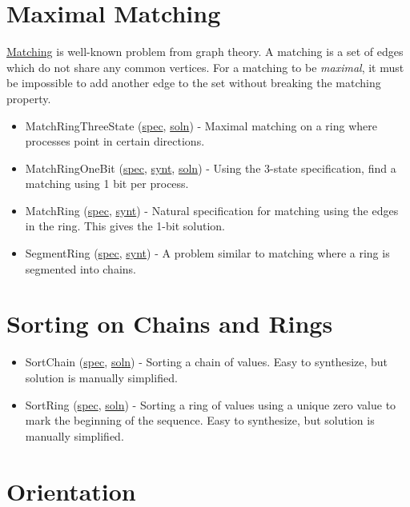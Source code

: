 \section{Maximal Matching}

\href{http://en.wikipedia.org/wiki/Matching_(graph_theory)}{Matching} is well-known problem from graph theory.
A matching is a set of edges which do not share any common vertices.
For a matching to be \textit{maximal}, it must be impossible to add another edge to the set without breaking the matching property.
\begin{itemize}
\item MatchRingThreeState (\href{\examplespec/MatchRingThreeState.prot}{spec}, \href{\examplesoln/MatchRingThreeState.prot}{soln})
- Maximal matching on a ring where processes point in certain directions.
\item MatchRingOneBit (\href{\examplespec/MatchRingOneBit.prot}{spec}, \href{\examplesynt/MatchRingOneBit.prot}{synt}, \href{\examplesoln/MatchRingOneBit.prot}{soln})
- Using the 3-state specification, find a matching using 1 bit per process.
\item MatchRing (\href{\examplespec/MatchRing.prot}{spec}, \href{\examplesynt/MatchRing.prot}{synt})
- Natural specification for matching using the edges in the ring.
This gives the 1-bit solution.
\item SegmentRing (\href{\examplespec/SegmentRing.prot}{spec}, \href{\examplesynt/SegmentRing.prot}{synt})
- A problem similar to matching where a ring is segmented into chains.
\end{itemize}

\section{Sorting on Chains and Rings}

\begin{itemize}
\item SortChain (\href{\examplespec/SortChain.prot}{spec}, \href{\examplesoln/SortChain.prot}{soln})
- Sorting a chain of values.
Easy to synthesize, but solution is manually simplified.
\item SortRing (\href{\examplespec/SortRing.prot}{spec}, \href{\examplesoln/SortRing.prot}{soln})
- Sorting a ring of values using a unique zero value to mark the beginning of the sequence.
Easy to synthesize, but solution is manually simplified.
\end{itemize}

\section{Orientation}

